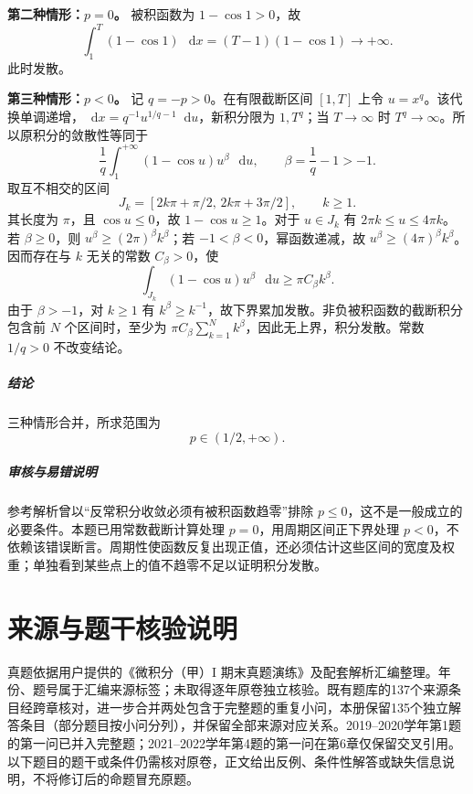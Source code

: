 \documentclass[UTF8,fontset=fandol,12pt,oneside,openany]{ctexrep}
\newcommand{\dd}{\mathop{}\!\mathrm d}
\theoremstyle{definition}
\begin{document}
\textbf{第二种情形：$p=0$。} 被积函数为 $1-\cos1>0$，故
\[
\int_1^T(1-\cos1)\,\dd x=(T-1)(1-\cos1)\to+\infty.
\]
此时发散。

\textbf{第三种情形：$p<0$。} 记 $q=-p>0$。在有限截断区间 $[1,T]$ 上令 $u=x^q$。该代换单调递增，$\dd x=q^{-1}u^{1/q-1}\dd u$，新积分限为 $1,T^q$；当 $T\to\infty$ 时 $T^q\to\infty$。所以原积分的敛散性等同于
\[
\frac1q\int_1^{+\infty}(1-\cos u)u^\beta\,\dd u,
\qquad \beta=\frac1q-1>-1.
\]
取互不相交的区间
\[
J_k=[2k\pi+\pi/2,\,2k\pi+3\pi/2],\qquad k\ge1.
\]
其长度为 $\pi$，且 $\cos u\le0$，故 $1-\cos u\ge1$。对于 $u\in J_k$ 有 $2\pi k\le u\le4\pi k$。若 $\beta\ge0$，则 $u^\beta\ge(2\pi)^\beta k^\beta$；若 $-1<\beta<0$，幂函数递减，故 $u^\beta\ge(4\pi)^\beta k^\beta$。因而存在与 $k$ 无关的常数 $C_\beta>0$，使
\[
\int_{J_k}(1-\cos u)u^\beta\,\dd u
\ge\pi C_\beta k^\beta.
\]
由于 $\beta>-1$，对 $k\ge1$ 有 $k^\beta\ge k^{-1}$，故下界累加发散。非负被积函数的截断积分包含前 $N$ 个区间时，至少为 $\pi C_\beta\sum_{k=1}^N k^\beta$，因此无上界，积分发散。常数 $1/q>0$ 不改变结论。

\paragraph{结论} 三种情形合并，所求范围为
\[
\boxed{p\in(1/2,+\infty)}.
\]

\paragraph{审核与易错说明} 参考解析曾以“反常积分收敛必须有被积函数趋零”排除 $p\le0$，这不是一般成立的必要条件。本题已用常数截断计算处理 $p=0$，用周期区间正下界处理 $p<0$，不依赖该错误断言。周期性使函数反复出现正值，还必须估计这些区间的宽度及权重；单独看到某些点上的值不趋零不足以证明积分发散。
\chapter*{来源与题干核验说明}



真题依据用户提供的《微积分（甲）I 期末真题演练》及配套解析汇编整理。年份、题号属于汇编来源标签；未取得逐年原卷独立核验。既有题库的137个来源条目经跨章核对，进一步合并两处包含于完整题的重复小问，本册保留135个独立解答条目（部分题目按小问分列），并保留全部来源对应关系。2019--2020学年第1题的第一问已并入完整题；2021--2022学年第4题的第一问在第6章仅保留交叉引用。以下题目的题干或条件仍需核对原卷，正文给出反例、条件性解答或缺失信息说明，不将修订后的命题冒充原题。
\end{document}
